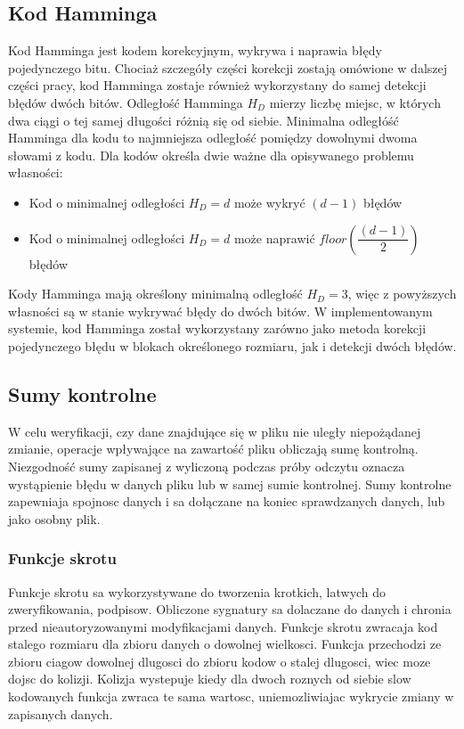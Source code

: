 \subsection{Kod Hamminga}
Kod Hamminga jest kodem korekcyjnym, wykrywa i naprawia błędy pojedynczego bitu. Chociaż szczegóły części korekcji zostają omówione w dalszej części pracy, kod Hamminga zostaje również wykorzystany do samej detekcji błędów dwóch bitów.
Odległość Hamminga $H_D$ mierzy liczbę miejsc, w których dwa ciągi o tej samej długości różnią się od siebie. Minimalna odległóść Hamminga dla kodu to najmniejsza odległość pomiędzy dowolnymi dwoma słowami z kodu. Dla kodów określa dwie ważne dla opisywanego problemu własności:
\begin{itemize}
        \item Kod  o minimalnej odległości $H_D = d$ może wykryć $(d-1)$ błędów
        \item Kod o minimalnej odległości $H_D = d$ może naprawić $floor\left(\dfrac{(d-1)}{2}\right)$ błędów
\end{itemize}
Kody Hamminga mają określony minimalną odległość $H_D = 3$, więc z powyższych własności są w stanie wykrywać błędy do dwóch bitów.  W implementowanym systemie, kod Hamminga został wykorzystany zarówno jako metoda korekcji pojedynczego błędu w blokach określonego rozmiaru, jak i detekcji dwóch błędów.


\subsection{Sumy kontrolne}
    W celu weryfikacji, czy dane znajdujące się w pliku nie uległy niepożądanej zmianie, operacje wpływające na zawartość pliku obliczają sumę kontrolną. Niezgodność sumy zapisanej z wyliczoną podczas próby odczytu oznacza wystąpienie błędu w danych pliku lub w samej sumie kontrolnej. Sumy kontrolne zapewniaja spojnosc danych i sa dołączane na koniec sprawdzanych danych, lub jako osobny plik. 
\subsubsection{Funkcje skrotu}
Funkcje skrotu sa wykorzystywane do tworzenia krotkich, latwych do zweryfikowania, podpisow. Obliczone sygnatury sa dolaczane do danych i chronia przed nieautoryzowanymi modyfikacjami danych. Funkcje skrotu zwracaja kod stalego rozmiaru dla zbioru danych o dowolnej wielkosci. Funkcja przechodzi ze zbioru ciagow dowolnej dlugosci do zbioru kodow o stalej dlugosci, wiec moze dojsc do kolizji. Kolizja wystepuje kiedy dla dwoch roznych od siebie slow kodowanych funkcja zwraca te sama wartosc, uniemozliwiajac wykrycie zmiany w zapisanych danych. 
